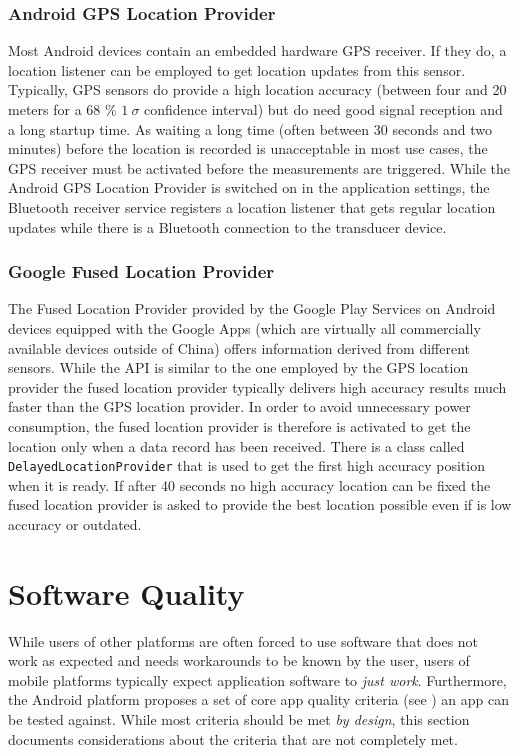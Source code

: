\subsubsection{Android GPS Location Provider}
Most Android devices contain an embedded hardware GPS receiver. If they do, a location listener can be employed to get location updates from this sensor. Typically, GPS sensors do provide a high location accuracy (between four and 20 meters for a 68 \% \/ $1~\sigma$ confidence interval) but do need good signal reception and a long startup time. As waiting a long time (often between 30 seconds and two minutes) before the location is recorded is unacceptable in most use cases, the GPS receiver must be activated before the measurements are triggered. While the Android GPS Location Provider is switched on in the application settings, the Bluetooth receiver service registers a location listener that gets regular location updates while there is a Bluetooth connection to the transducer device.

\subsubsection{Google Fused Location Provider} 
The Fused Location Provider provided by the Google Play Services on Android devices equipped with the Google Apps (which are virtually all commercially available devices outside of China) offers information derived from different sensors. While the API is similar to the one employed by the GPS location provider the fused location provider typically delivers high accuracy results much faster than the GPS location provider. In order to avoid unnecessary power consumption, the fused location provider is therefore is activated to get the location only when a data record has been received. There is a class called \texttt{DelayedLocationProvider} that is used to get the first high accuracy position when it is ready. If after 40 seconds no high accuracy location can be fixed the fused location provider is asked to provide the best location possible even if is low accuracy or outdated. 

\section{Software Quality}
While users of other platforms are often forced to use software that does not work as expected and needs workarounds to be known by the user, users of mobile platforms typically expect application software to \emph{just work}. Furthermore, the Android platform proposes a set of core app quality criteria (see \cite{CoreAppQ}) an app can be tested against. While most criteria should be met \emph{by design}, this section documents considerations about the criteria that are not completely met.

